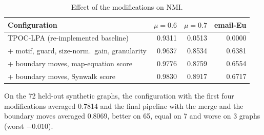 \documentclass[conference]{IEEEtran}
\begin{document}
\begin{table}[!htbp]
\centering
\caption{Effect of the modifications on NMI.}
\label{tab:abl}
\scriptsize
\begin{tabular}{>{\raggedright\arraybackslash}p{38mm}rrr}
\toprule
Configuration & $\mu{=}0.6$ & $\mu{=}0.7$ & email-Eu \\
\midrule
TPOC-LPA (re-implemented baseline) & 0.9311 & 0.0513 & 0.0000 \\
+ motif, guard, size-norm.\ gain, granularity & 0.9637 & 0.8534 & 0.6381 \\
+ boundary moves, map-equation score & 0.9776 & 0.8759 & 0.6554 \\
+ boundary moves, Synwalk score & 0.9830 & 0.8917 & 0.6717 \\
\bottomrule
\end{tabular}
\end{table}
On the 72 held-out synthetic graphs, the configuration with the first four modifications averaged 0.7814 and the final pipeline with the merge and the boundary moves averaged 0.8069, better on 65, equal on 7 and worse on 3 graphs (worst $-0.010$).
\end{document}
